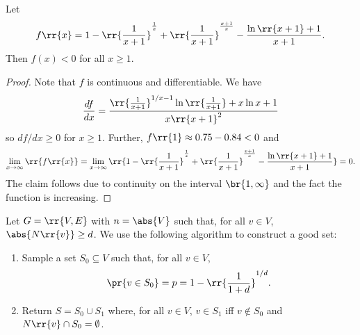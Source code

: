 \documentclass{article}
\begin{document}
\begin{claim*}
  Let
  \begin{align*}
    f\rr{x}= 1-\rr{\frac{1}{x+1}}^{\frac{1}{x}}+\rr{\frac{1}{x+1}}^{\frac{x+1}{x}}-\frac{\ln\rr{x+1}+1}{x+1}.
  \end{align*}
  Then $f(x)<0$ for all $x\geq 1$.
  \begin{proof}
    Note that $f$ is continuous and differentiable. We have
    \begin{align*}
      \frac{df}{dx} = \frac{\rr{\frac{1}{x+1}}^{1/x-1}\ln\rr{\frac{1}{x+1}}+x\ln{x+1}}{x\rr{x+1}^2}
    \end{align*}
    so $df/dx \geq 0$ for $x\geq 1$. Further, $f\rr{1}\approx 0.75-0.84<0$ and
    \begin{align*}
      \lim_{x\to\infty}\rr{f\rr{x}} =
      \lim_{x\to\infty}\rr{1-\rr{\frac{1}{x+1}}^{\frac{1}{x}}+\rr{\frac{1}{x+1}}^{\frac{x+1}{x}}-\frac{\ln\rr{x+1}+1}{x+1}} = 0.
    \end{align*}
    The claim follows due to continuity on the interval $\br{1,\infty}$ and the fact the function is increasing.
  \end{proof}
\end{claim*}

Let $G=\rr{V,E}$ with $n=\abs{V}$ such that, for all $v\in V$, $\abs{N\rr{v}}\geq d$.
We use the following algorithm to construct a good set:
\begin{enumerate}
  \item Sample a set $S_0\subseteq V$ such that, for all $v\in V$,
    \begin{align*}
      \pr{v\in S_0}=p=1-\rr{\frac{1}{1+d}}^{1/d}.
    \end{align*}
  \item Return $S=S_0\cup S_1$ where, for all $v\in V$, $v\in S_1$ iff $v\not\in S_0$
    and $N\rr{v}\cap S_0=\emptyset$.
\end{enumerate}
\end{document}
